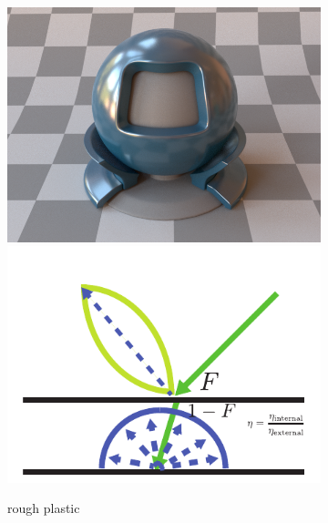 \begin{figure}
    \begin{subfigure}[t]{0.32\linewidth}
        \centering
        \begin{minipage}[t]{\linewidth}
            \includegraphics[width=\linewidth]{imgs/roughplastic_render.png}
            \includegraphics[width=\linewidth]{imgs/roughplastic.pdf}
        \end{minipage}
        \caption{rough plastic}
        \label{fig:rough_plastic}
    \end{subfigure}
    \begin{subfigure}[t]{0.32\linewidth}
        \centering
        \begin{minipage}[t]{\linewidth}

\end{minipage}
\end{subfigure}
\end{figure}

